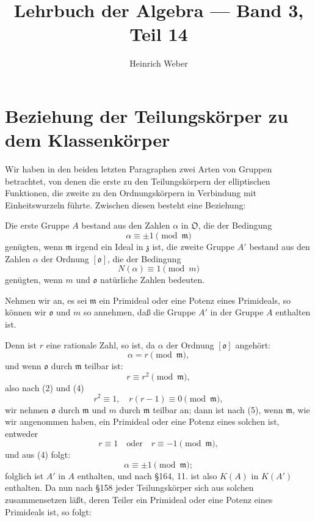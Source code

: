 \documentclass[12pt,a4paper]{article}
\title{Lehrbuch der Algebra --- Band 3, Teil 14}
\author{Heinrich Weber}
\date{}
\theoremstyle{definition}
\begin{document}
\maketitle
\thispagestyle{empty}

\setcounter{section}{168}
\setcounter{page}{619}

\section{Beziehung der Teilungskörper zu dem Klassenkörper}

Wir haben in den beiden letzten Paragraphen zwei Arten von Gruppen betrachtet, von denen die erste zu den Teilungskörpern der elliptischen Funktionen, die zweite zu den Ordnungskörpern in Verbindung mit Einheitswurzeln führte. Zwischen diesen besteht eine Beziehung:

Die erste Gruppe $A$ bestand aus den Zahlen $\alpha$ in $\mathfrak{O}$, die der Bedingung
\begin{equation}
\alpha \equiv \pm 1 \pmod{\mathfrak{m}}
\end{equation}
genügten, wenn $\mathfrak{m}$ irgend ein Ideal in $\mathfrak{z}$ ist, die zweite Gruppe $A'$ bestand aus den Zahlen $\alpha$ der Ordnung $[\mathfrak{o}]$, die der Bedingung
\begin{equation}
N(\alpha) \equiv 1 \pmod{m}
\end{equation}
genügten, wenn $m$ und $\mathfrak{o}$ natürliche Zahlen bedeuten.

Nehmen wir an, es sei $\mathfrak{m}$ ein Primideal oder eine Potenz eines Primideals, so können wir $\mathfrak{o}$ und $m$ so annehmen, daß die Gruppe $A'$ in der Gruppe $A$ enthalten ist.

Denn ist $r$ eine rationale Zahl, so ist, da $\alpha$ der Ordnung $[\mathfrak{o}]$ angehört:
\begin{equation}
\alpha = r \pmod{\mathfrak{m}},
\end{equation}
und wenn $\mathfrak{o}$ durch $\mathfrak{m}$ teilbar ist:
\begin{equation}
r \equiv r^2 \pmod{\mathfrak{m}},
\end{equation}
also nach (2) und (4)
\begin{equation}
r^2 \equiv 1, \quad r(r-1) \equiv 0 \pmod{\mathfrak{m}},
\end{equation}
wir nehmen $\mathfrak{o}$ durch $\mathfrak{m}$ und $m$ durch $\mathfrak{m}$ teilbar an; dann ist nach (5), wenn $\mathfrak{m}$, wie wir angenommen haben, ein Primideal oder eine Potenz eines solchen ist, entweder
\begin{equation}
r \equiv 1 \quad \text{oder} \quad r \equiv -1 \pmod{\mathfrak{m}},
\end{equation}
und aus (4) folgt:
\begin{equation}
\alpha \equiv \pm 1 \pmod{\mathfrak{m}};
\end{equation}
folglich ist $A'$ in $A$ enthalten, und nach \S 164, 11. ist also $K(A)$ in $K(A')$ enthalten. Da nun nach \S 158 jeder Teilungskörper sich aus solchen zusammensetzen läßt, deren Teiler ein Primideal oder eine Potenz eines Primideals ist, so folgt:
\end{document}
